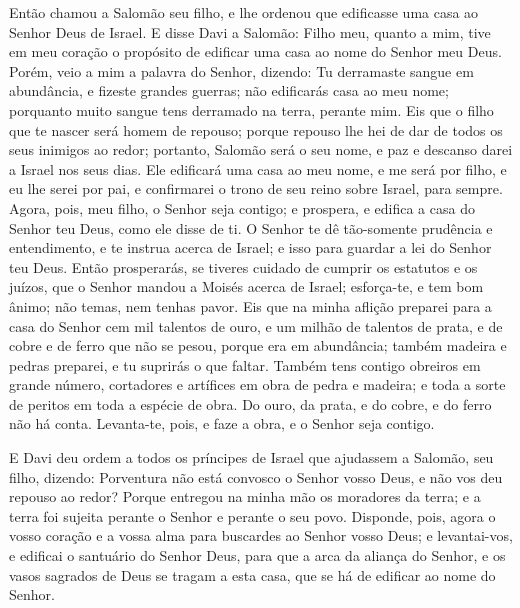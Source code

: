 Então chamou a Salomão seu filho, e lhe ordenou que edificasse uma
casa ao Senhor Deus de Israel. E disse Davi a Salomão: Filho
meu, quanto a mim, tive em meu coração o propósito de edificar uma
casa ao nome do Senhor meu Deus. Porém, veio a mim a palavra do
Senhor, dizendo: Tu derramaste sangue em abundância, e fizeste
grandes guerras; não edificarás casa ao meu nome; porquanto muito
sangue tens derramado na terra, perante mim. Eis que o filho que
te nascer será homem de repouso; porque repouso lhe hei de dar de
todos os seus inimigos ao redor; portanto, Salomão será o seu nome,
e paz e descanso darei a Israel nos seus dias. Ele edificará
uma casa ao meu nome, e me será por filho, e eu lhe serei por pai, e
confirmarei o trono de seu reino sobre Israel, para sempre.
Agora, pois, meu filho, o Senhor seja contigo; e prospera, e
edifica a casa do Senhor teu Deus, como ele disse de ti. O
Senhor te dê tão-somente prudência e entendimento, e te instrua
acerca de Israel; e isso para guardar a lei do Senhor teu Deus.
Então prosperarás, se tiveres cuidado de cumprir os estatutos
e os juízos, que o Senhor mandou a Moisés acerca de Israel;
esforça-te, e tem bom ânimo; não temas, nem tenhas pavor. Eis
que na minha aflição preparei para a casa do Senhor cem mil talentos
de ouro, e um milhão de talentos de prata, e de cobre e de ferro que
não se pesou, porque era em abundância; também madeira e pedras
preparei, e tu suprirás o que faltar. Também tens contigo
obreiros em grande número, cortadores e artífices em obra de pedra e
madeira; e toda a sorte de peritos em toda a espécie de obra.
Do ouro, da prata, e do cobre, e do ferro não há conta.
Levanta-te, pois, e faze a obra, e o Senhor seja contigo.

E Davi deu ordem a todos os príncipes de Israel que ajudassem a
Salomão, seu filho, dizendo: Porventura não está convosco o
Senhor vosso Deus, e não vos deu repouso ao redor? Porque entregou
na minha mão os moradores da terra; e a terra foi sujeita perante o
Senhor e perante o seu povo. Disponde, pois, agora o vosso
coração e a vossa alma para buscardes ao Senhor vosso Deus; e
levantai-vos, e edificai o santuário do Senhor Deus, para que a arca
da aliança do Senhor, e os vasos sagrados de Deus se tragam a esta
casa, que se há de edificar ao nome do Senhor.

\medskip

